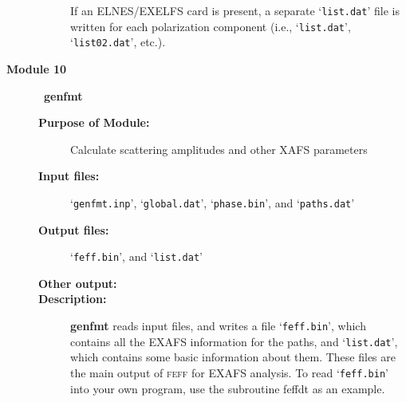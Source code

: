 \documentclass[11pt,oneside]{report} %
\newcommand{\program}[1]{\textsc{#1}}
\newcommand{\feff}{\program{feff}}
\newcommand{\file}[1]{`\texttt{#1}'}
\newcommand{\module}[1]{\textrm{\bf{#1}}}
\begin{document}
\begin{latexonly}
\begin{description}
\begin{description}
    If an ELNES/EXELFS card is present, a separate \file{list.dat} file is 
    written for each polarization component (i.e., \file{list.dat}, 
    \file{list02.dat}, etc.).
  \end{description}
\item [\large\textbf{Module 10}]\dotfill\  {\large\module{genfmt}}
  \begin{description}
  \item[\textbf{Purpose of Module:}] Calculate scattering amplitudes and other
    XAFS parameters
  \item[\textbf{Input files:}] \file{genfmt.inp},
    \file{global.dat}, \file{phase.bin}, and \file{paths.dat}
  \item[\textbf{Output files:}] \file{feff.bin}, and \file{list.dat}
  \item[\textbf{Other output:}]
  \item[\textbf{Description:}] \module{genfmt} reads input files, and writes a file
    \file{feff.bin}, which contains all the EXAFS information for the
    paths, and \file{list.dat}, which contains some basic information
    about them. These files are the main output of {\feff} for EXAFS
    analysis. To read \file{feff.bin} into your own program, use the 
    subroutine feffdt as an example.


\end{description}
\end{description}
\end{latexonly}
\end{document}
